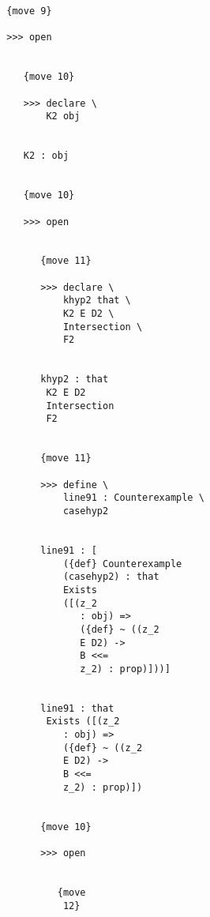 \documentclass[12pt]{article}
\begin{document}
\begin{verbatim}
                           {move 9}

                           >>> open


                              {move 10}

                              >>> declare \
                                  K2 obj


                              K2 : obj


                              {move 10}

                              >>> open


                                 {move 11}

                                 >>> declare \
                                     khyp2 that \
                                     K2 E D2 \
                                     Intersection \
                                     F2


                                 khyp2 : that 
                                  K2 E D2 
                                  Intersection 
                                  F2


                                 {move 11}

                                 >>> define \
                                     line91 : Counterexample \
                                     casehyp2


                                 line91 : [
                                     ({def} Counterexample 
                                     (casehyp2) : that 
                                     Exists 
                                     ([(z_2 
                                        : obj) => 
                                        ({def} ~ ((z_2 
                                        E D2) -> 
                                        B <<= 
                                        z_2) : prop)]))]


                                 line91 : that 
                                  Exists ([(z_2 
                                     : obj) => 
                                     ({def} ~ ((z_2 
                                     E D2) -> 
                                     B <<= 
                                     z_2) : prop)])


                                 {move 10}

                                 >>> open


                                    {move 
                                     12}


\end{verbatim}
\end{document}
